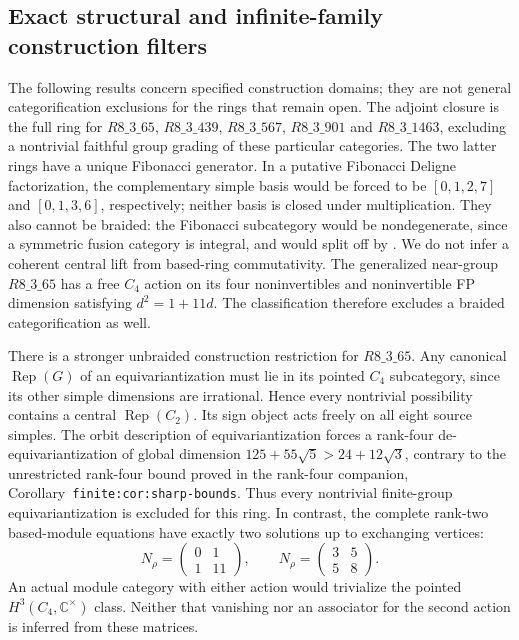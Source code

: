 \subsection{Exact structural and infinite-family construction filters}
The following results concern specified construction domains; they are not
general categorification exclusions for the rings that remain open.
The adjoint closure is the full ring for
$R8\_3\_65$, $R8\_3\_439$, $R8\_3\_567$,
$R8\_3\_901$ and $R8\_3\_1463$, excluding a nontrivial faithful group
grading of these particular categories. The two latter rings have a unique
Fibonacci generator. In a putative Fibonacci Deligne factorization, the
complementary simple basis would be forced to be $[0,1,2,7]$ and
$[0,1,3,6]$, respectively; neither basis is closed under multiplication.
They also cannot be braided: the Fibonacci subcategory would be
nondegenerate, since a symmetric fusion category is integral, and would
split off by \cite[Corollary~2.46 and Theorem~3.13]{DGNO}.
We do not infer a coherent central lift from based-ring commutativity.
The generalized near-group $R8\_3\_65$ has a free $C_4$ action on its four
noninvertibles and noninvertible FP dimension satisfying $d^2=1+11d$.
The classification \cite[Theorem~1]{SchopierayBraidedGNG} therefore excludes
a braided categorification as well.

There is a stronger unbraided construction restriction for $R8\_3\_65$.
Any canonical $\operatorname{Rep}(G)$ of an equivariantization must lie in
its pointed $C_4$ subcategory, since its other simple dimensions are
irrational. Hence every nontrivial possibility contains a central
$\operatorname{Rep}(C_2)$. Its sign object acts freely on all eight source
simples. The orbit description of equivariantization forces a rank-four
de-equivariantization of global dimension $125+55\sqrt5>24+12\sqrt3$,
contrary to the unrestricted rank-four bound proved in the rank-four
companion, Corollary~\texttt{finite:cor:sharp-bounds}. Thus every
nontrivial finite-group equivariantization is excluded for this ring.
In contrast, the complete rank-two based-module equations have exactly
two solutions up to exchanging vertices:
\[
N_\rho=\begin{pmatrix}0&1\\1&11\end{pmatrix},\qquad
N_\rho=\begin{pmatrix}3&5\\5&8\end{pmatrix}.
\]
An actual module category with either action would trivialize the pointed
$H^3(C_4,\mathbb C^\times)$ class. Neither that vanishing nor an
associator for the second action is inferred from these matrices.

